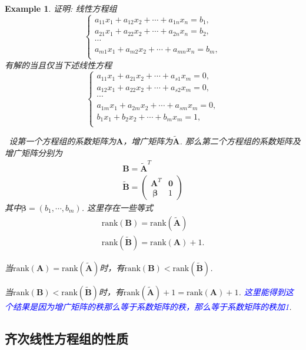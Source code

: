 \documentclass{article}
\newtheorem{example}[theorem]{Example}
\newcommand{\hints}{{\color{blue} \text{hints}}}
\newcommand{\mbf}[1]{\bm{#1}}
\newcommand{\rank}[1]{\text{rank}\left(#1\right)} %
\newcommand{\bluet}[1]{\textcolor{blue}{#1}}
\begin{document}
\begin{example}
\rm 证明: 线性方程组
$$
\left\{
\begin{array}{l}
a_{11}x_1 + a_{12}x_2 + \cdots + a_{1n}x_n = b_1, \\
a_{21}x_1 + a_{22}x_2 + \cdots + a_{2n}x_n = b_2, \\
\cdots \\
a_{m1}x_1 + a_{m2}x_2 + \cdots + a_{mn}x_n = b_m, \\
\end{array} \right.
$$
有解的当且仅当下述线性方程
$$
\left\{
\begin{array}{l}
a_{11}x_1 + a_{21}x_2 + \cdots + a_{s1}x_m = 0, \\
a_{12}x_1 + a_{22}x_2 + \cdots + a_{s2}x_m = 0, \\
\cdots \\
a_{1m}x_1 + a_{2m}x_2 + \cdots +a_{sm}x_m = 0, \\
b_{1}x_1 + b_{2}x_2 + \cdots+ b_{m}x_m = 1, \\
\end{array} \right.
$$

\hints\ 设第一个方程组的系数矩阵为$\mbf{A}$，增广矩阵为$\tilde{\mbf{A}}$. 那么第二个方程组的系数矩阵及增广矩阵分别为
$$
\begin{array}{ll}
\mbf{B} = \tilde{\mbf{A}}^T \\
\tilde{\mbf{B}}= \begin{pmatrix}
\mbf{A}^T & \mbf{0} \\\
\mbf{\beta} & 1
\end{pmatrix}
\end{array}
$$
其中$\mbf{\beta} = (b_1,\cdots,b_m)$. 这里存在一些等式
$$
\begin{array}{ll}
\rank{\mbf{B}} = \rank{\tilde{\mbf{A}}} \\
\rank{\tilde{\mbf{B}}} = \rank{\mbf{A}} + 1.
\end{array}
$$

当$\rank{\mbf{A}} = \rank{\tilde{\mbf{A}}}$时，有$\rank{\mbf{B}} < \rank{\tilde{\mbf{B}}}$. 

当$\rank{\mbf{B}} < \rank{\tilde{\mbf{B}}}$时，有$\rank{\tilde{\mbf{A}}} + 1 = \rank{\mbf{A}} + 1$. \bluet{这里能得到这个结果是因为增广矩阵的秩那么等于系数矩阵的秩，那么等于系数矩阵的秩加1}. 
\end{example}

\subsection{齐次线性方程组的性质}
\end{document}
